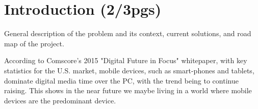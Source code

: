 
% 
% 

\section{Introduction (2/3pgs)}

General description of the problem and its context, current solutions, and road map of the project.

According to Comscore's 2015 "Digital Future in Focus" whitepaper, with key statistics for the U.S. market, mobile devices, such as smart-phones and tablets, dominate digital media time over the PC, with the trend being to continue raising. This shows in the near future we maybe living in a world where mobile devices are the predominant device.